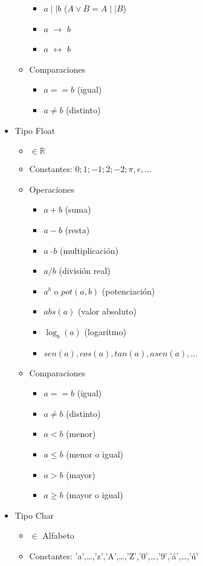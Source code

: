 \documentclass[a4paper,10pt]{article}
\begin{document}
\begin{itemize}
\begin{itemize}
\begin{itemize}
				\item $a \mid \mid b$ ($A \vee B = A \mid \mid B$)
				\item $a$ $\rightarrow$ $b$ 
				\item $a$ $\leftrightarrow$ $b$ 
			\end{itemize}
			\item Comparaciones
			\begin{itemize}
				\item $a == b$ (igual)
				\item $a \neq b$ (distinto)
			\end{itemize}
		\end{itemize}
		\item Tipo Float
		\begin{itemize}
			\item $\in \mathbb{R}$
			\item Constantes: $0;1;-1;2;-2;\pi,e,\dots$
			\item Operaciones
			\begin{itemize}
				\item $a + b$ (suma)
				\item $a - b$ (resta)
				\item $a \cdot b$ (multiplicación)
				\item $a / b$ (división real)
				\item $a^{b}$ o $pot(a,b)$ (potenciación)
				\item $abs(a)$ (valor absoluto)
				\item $\log_{b}(a)$ (logarítmo)
				\item $sen(a),cos(a),tan(a),asen(a),\dots$
			\end{itemize}
			\item Comparaciones
			\begin{itemize}
				\item $a == b$ (igual)
				\item $a \neq b$ (distinto)
				\item $a < b$ (menor)
				\item $a \leq b$ (menor o igual)
				\item $a > b$ (mayor)
				\item $a \geq b$ (mayor o igual)
			\end{itemize}
		\end{itemize}
		\item Tipo Char
		\begin{itemize}
			\item $\in$ Alfabeto
			\item Constantes: 'a',\dots,'z','A',\dots,'Z','0',\dots,'9','á',\dots,'ú'

\end{itemize}
\end{itemize}
\end{document}
